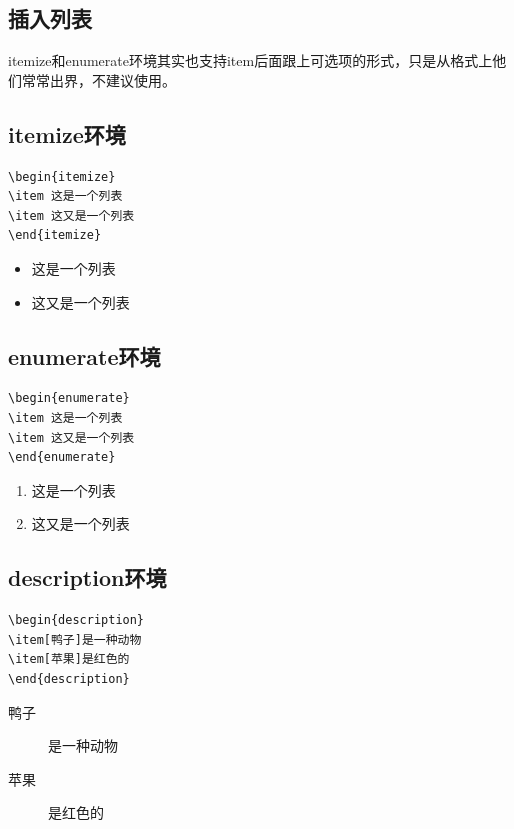 \documentclass[11pt,oneside]{book}
\begin{document}
\begin{common-format}
\section{插入列表}
itemize和enumerate环境其实也支持item后面跟上可选项的形式，只是从格式上他们常常出界，不建议使用。
\subsection{itemize环境}
\begin{Verbatim}
\begin{itemize}
\item 这是一个列表
\item 这又是一个列表
\end{itemize}
\end{Verbatim}


\begin{itemize}
\item 这是一个列表
\item 这又是一个列表
\end{itemize}

\subsection{enumerate环境}
\begin{Verbatim}
\begin{enumerate}
\item 这是一个列表
\item 这又是一个列表
\end{enumerate}
\end{Verbatim}

\begin{enumerate}
\item 这是一个列表
\item 这又是一个列表
\end{enumerate}

\subsection{description环境}
\begin{Verbatim}
\begin{description}
\item[鸭子]是一种动物
\item[苹果]是红色的
\end{description}
\end{Verbatim}
\begin{description}
\item[鸭子]是一种动物
\item[苹果]是红色的
\end{description}



\end{common-format}
\end{document}
